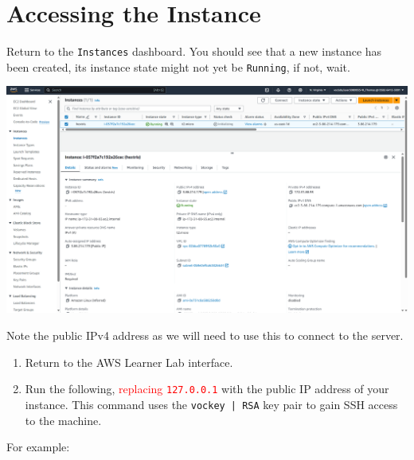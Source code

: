 \documentclass{csse4400}
\begin{document}
\section{Accessing the Instance}

Return to the \texttt{Instances} dashboard.
You should see that a new instance has been created, its instance state might not yet be \texttt{Running}, if not, wait.

\vspace{3mm}
\noindent
\includegraphics[width=\textwidth]{images/instance-interface}
\vspace{3mm}

\noindent
Note the public IPv4 address as we will need to use this to connect to the server.

\begin{enumerate}
    \item Return to the AWS Learner Lab interface.
    \item Run the following, \textcolor{red}{replacing \texttt{127.0.0.1}} with the public IP address of your instance.
          This command uses the \texttt{vockey | RSA} key pair to gain SSH access to the machine.
\end{enumerate}

For example:
\hspace{5mm}
\end{document}
